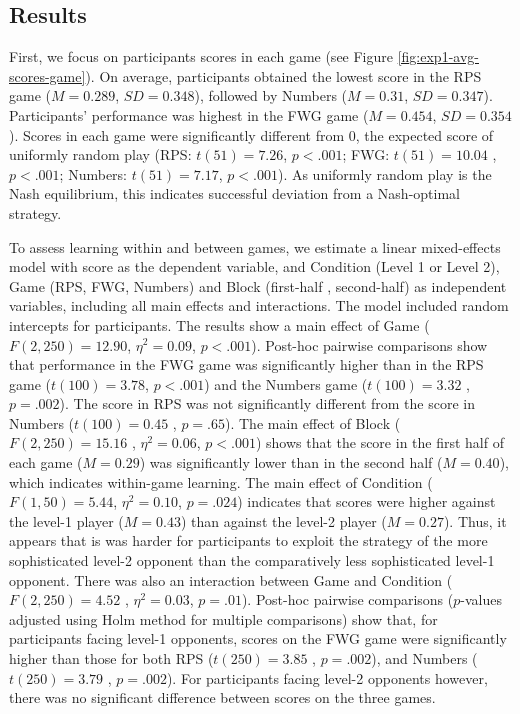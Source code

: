 \documentclass[smallextended]{svjour3}       %
\begin{document}
\hypertarget{results}{%
\subsection{Results}\label{results}}

First, we focus on participants scores in each game (see Figure
\ref{fig:exp1-avg-scores-game}). On average, participants obtained the
lowest score in the RPS game (\(M = 0.289\), \(SD = 0.348\)), followed
by Numbers (\(M = 0.31\), \(SD = 0.347\)). Participants' performance was
highest in the FWG game (\(M = 0.454\), \(SD = 0.354\)). Scores in each
game were significantly different from 0, the expected score of
uniformly random play (RPS: \(t(51) = 7.26\), \(p < .001\); FWG:
\(t(51) = 10.04\) , \(p < .001\); Numbers: \(t(51) = 7.17\),
\(p < .001\)). As uniformly random play is the Nash equilibrium, this
indicates successful deviation from a Nash-optimal strategy.

To assess learning within and between games, we estimate a linear
mixed-effects model with score as the dependent variable, and Condition
(Level 1 or Level 2), Game (RPS, FWG, Numbers) and Block (first-half ,
second-half) as independent variables, including all main effects and
interactions. The model included random intercepts for participants. The
results show a main effect of Game (\(F(2,250) = 12.90\),
\(\eta^{2} = 0.09\), \(p < .001\)). Post-hoc pairwise comparisons show
that performance in the FWG game was significantly higher than in the
RPS game (\(t(100) =3.78\), \(p < .001\)) and the Numbers game
(\(t(100) = 3.32\) , \(p = .002\)). The score in RPS was not
significantly different from the score in Numbers (\(t(100) = 0.45\) ,
\(p = .65\)). The main effect of Block (\(F(2,250) = 15.16\) ,
\(\eta^{2} = 0.06\), \(p < .001\)) shows that the score in the first
half of each game (\(M = 0.29\)) was significantly lower than in the
second half (\(M = 0.40\)), which indicates within-game learning. The
main effect of Condition (\(F(1,50) = 5.44\), \(\eta^{2} = 0.10\),
\(p = .024\)) indicates that scores were higher against the level-1
player (\(M = 0.43\)) than against the level-2 player (\(M = 0.27\)).
Thus, it appears that is was harder for participants to exploit the
strategy of the more sophisticated level-2 opponent than the
comparatively less sophisticated level-1 opponent. There was also an
interaction between Game and Condition (\(F(2,250) = 4.52\) ,
\(\eta^{2} = 0.03\), \(p = .01\)). Post-hoc pairwise comparisons
(\(p\)-values adjusted using Holm method for multiple comparisons) show
that, for participants facing level-1 opponents, scores on the FWG game
were significantly higher than those for both RPS (\(t(250) = 3.85\) ,
\(p = .002\)), and Numbers (\(t(250) = 3.79\) , \(p = .002\)). For
participants facing level-2 opponents however, there was no significant
difference between scores on the three games.
\end{document}
